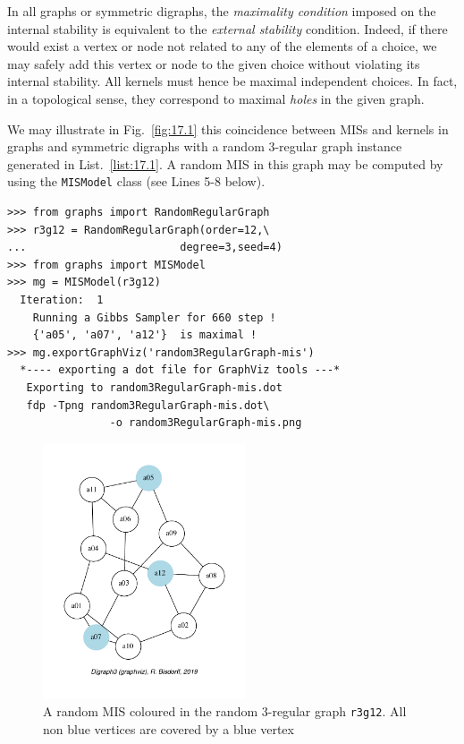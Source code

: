 In all graphs or symmetric digraphs, the \emph{maximality condition} imposed on the internal stability is equivalent to the \emph{external stability} condition. Indeed, if there would exist a vertex or node not related to any of the elements of a choice, we may safely add this vertex or node to the given choice without violating its internal stability. All kernels must hence be maximal independent choices. In fact, in a topological sense, they correspond to maximal \emph{holes} in the given graph.

We may illustrate in Fig.~\vref{fig:17.1} this coincidence between MISs and kernels in graphs and symmetric digraphs with a random 3-regular graph instance generated in List.~\vref{list:17.1}. A random MIS in this graph may be computed by using the \texttt{MISModel} class (see Lines 5-8 below).
\begin{lstlisting}[caption={Generating a random 3-regular graph of order 12},label=list:17.1]
>>> from graphs import RandomRegularGraph
>>> r3g12 = RandomRegularGraph(order=12,\
...                        degree=3,seed=4)
>>> from graphs import MISModel
>>> mg = MISModel(r3g12)
  Iteration:  1
    Running a Gibbs Sampler for 660 step !
    {'a05', 'a07', 'a12'}  is maximal !
>>> mg.exportGraphViz('random3RegularGraph-mis')
  *---- exporting a dot file for GraphViz tools ---*
   Exporting to random3RegularGraph-mis.dot
   fdp -Tpng random3RegularGraph-mis.dot\
                -o random3RegularGraph-mis.png
\end{lstlisting}
\begin{figure}[h]
\sidecaption[t]
\includegraphics[width=6cm]{Figures/17-1-random3RegularGraph-mis.pdf}
\caption{A random MIS coloured in the random 3-regular graph \texttt{r3g12}. All non blue vertices are covered by a blue vertex}
\label{fig:17.1}       %
\end{figure}

